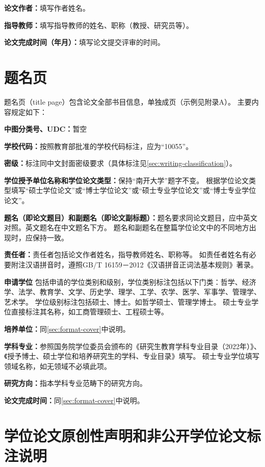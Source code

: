 \textbf{论文作者：}填写作者姓名。

\textbf{指导教师：}填写指导教师的姓名、职称（教授、研究员等）。

\textbf{论文完成时间（年月）：}填写论文提交评审的时间。

\section{题名页}

题名页（title page）包含论文全部书目信息，单独成页（示例见附录A）。
主要内容规定如下：

\textbf{中图分类号、UDC：}暂空

\textbf{学校代码：}按照教育部批准的学校代码标注，应为“10055”。

\textbf{密级：}标注同中文封面密级要求（具体标注见\ref{sec:writing-classification}）。

\textbf{学位授予单位名称和学位论文类型：}保持“南开大学”题字不变。
根据学位论文类型填写“硕士学位论文”或“博士学位论文”或“硕士专业学位论文”或“博士专业学位论文”。

\textbf{题名（即论文题目）和副题名（即论文副标题）：}题名要求同论文题目，应中英文对照。英文题名在中文题名下方。
题名和副题名在整篇学位论文中的不同地方出现时，应保持一致。

\textbf{责任者：}责任者包括论文作者姓名，指导教师姓名、职称等。
如责任者姓名有必要附注汉语拼音时，遵照GB/T 16159－2012《汉语拼音正词法基本规则》著录。

\textbf{申请学位}
包括申请的学位类别和级别，学位类别标注包括以下门类：哲学、经济学、法学、教育学、文学、历史学、理学、工学、农学、医学、军事学、管理学、艺术学。
学位级别标注包括硕士、博士。如哲学硕士、管理学博士。
硕士专业学位直接标注其名称，如工商管理硕士、工程硕士等。

\textbf{培养单位：}同\ref{sec:format-cover}中说明。

\textbf{学科专业：}参照国务院学位委员会颁布的《研究生教育学科专业目录（2022年）》、《授予博士、硕士学位和培养研究生的学科、专业目录》填写。
硕士专业学位填写领域名称，如无领域不必填此项。

\textbf{研究方向：}指本学科专业范畴下的研究方向。

\textbf{论文完成时间：}同\ref{sec:format-cover}中说明。

\section{学位论文原创性声明和非公开学位论文标注说明}

